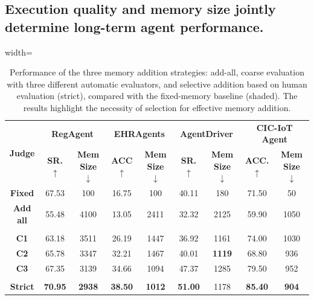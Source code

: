 \documentclass[11pt]{article}
\theoremstyle{plain}
\theoremstyle{definition}
\newcommand{\zhen}[1]{\textcolor{blue}{[Zhen: #1]}}
\begin{document}
\label{sec:addition}


\subsection{Execution quality and memory size jointly determine long-term agent performance.}
\label{sec:add_result}
\begin{table}[ht!]
\centering
\caption{Performance of the three memory addition strategies: add-all, coarse evaluation with three different automatic evaluators, and selective addition based on human evaluation (strict), compared with the fixed-memory baseline (shaded).
The results highlight the necessity of selection for effective memory addition.
}
\setlength{\tabcolsep}{2pt}
\begin{adjustbox}{width=\linewidth} %
\Large
\begin{tabular}{c|cc|cc|cc|cc}
\toprule
\multirow{2}{*}{\textbf{Judge}} & \multicolumn{2}{c|}{\textbf{RegAgent}}
& \multicolumn{2}{c|}{\textbf{EHRAgents}} 
& \multicolumn{2}{c|}{\textbf{AgentDriver}} 
& \multicolumn{2}{c}{\textbf{CIC-IoT Agent}} \\  
& \textbf{SR. $\uparrow$} & \textbf{Mem Size $\downarrow$}  
& \textbf{ACC $\uparrow$} & \textbf{Mem Size $\downarrow$}  
& \textbf{SR. $\uparrow$} & \textbf{Mem Size $\downarrow$} 
& \textbf{ACC. $\uparrow$}  & \textbf{Mem Size $\downarrow$} \\ \hline
\rowcolor{gray!20}\textbf{Fixed}  &67.53 & 100  &16.75              
 & {100} & 40.11 & {180} & 71.50 & 50   \\ \hline 
\textbf{Add all}     & 55.48 & 4100          
&13.05&  2411  & 32.32 & 2125  & 59.90 &  1050 \\ \hline
\rowcolor{gray!20}\multicolumn{9}{c}{\textbf{Coarse}}        \\     
\textbf{C1}  &63.18 &3511   &26.19&  1447& 36.92  &  1161 & 74.00 &  1030 \\ \hline
\textbf{C2}   &65.78 & 3347 & 32.21 & 1467 & 40.01 & \textbf{1119} & 68.80 &  936\\ \hline
\textbf{C3}  &67.35 & 3139  & 34.66 & 1094 & 47.37 & 1285 &79.50 & 952\\ \hline
\rowcolor{gray!20}\multicolumn{9}{c}{\textbf{Strict}}        \\
\textbf{Strict}     &\textbf{70.95} & \textbf{2938}               
&\textbf{38.50}& \textbf{1012}  & \textbf{51.00} &  {1178}   & \textbf{85.40} & \textbf{904} \\ \bottomrule
\end{tabular}
\end{adjustbox}
\label{tab:comparison}
\end{table}
\end{document}
